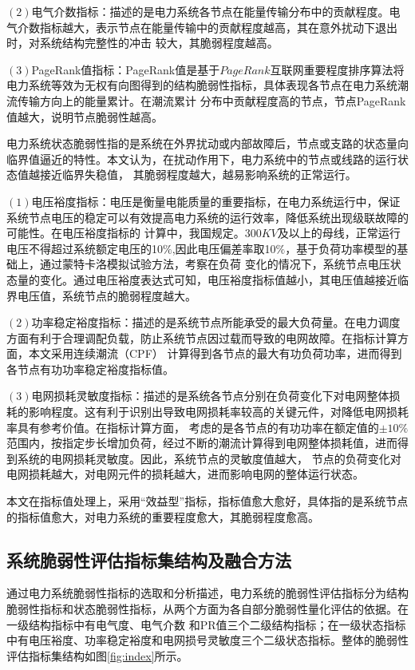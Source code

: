 $(2)$电气介数指标：描述的是电力系统各节点在能量传输分布中的贡献程度。电气介数指标越大，表示节点在能量传输中的贡献程度越高，其在意外扰动下退出时，对系统结构完整性的冲击
较大，其脆弱程度越高。

$(3)$PageRank值指标：PageRank值是基于$PageRank$互联网重要程度排序算法将电力系统等效为无权有向图得到的结构脆弱性指标，具体表现各节点在电力系统潮流传输方向上的能量累计。在潮流累计
分布中贡献程度高的节点，节点PageRank值越大，说明节点脆弱性越高。

电力系统状态脆弱性指的是系统在外界扰动或内部故障后，节点或支路的状态量向临界值逼近的特性。本文认为，在扰动作用下，电力系统中的节点或线路的运行状态值越接近临界失稳值，
其脆弱程度越大，越易影响系统的正常运行。

$(1)$电压裕度指标：电压是衡量电能质量的重要指标，在电力系统运行中，保证系统节点电压的稳定可以有效提高电力系统的运行效率，降低系统出现级联故障的可能性。在电压裕度指标的
计算中，我国规定。300$KV$及以上的母线，正常运行电压不得超过系统额定电压的10$\%$,因此电压偏差率取10$\%$，基于负荷功率模型的基础上，通过蒙特卡洛模拟试验方法，考察在负荷
变化的情况下，系统节点电压状态量的变化。通过电压裕度表达式可知，电压裕度指标值越小，其电压值越接近临界电压值，系统节点的脆弱程度越大。

$(2)$功率稳定裕度指标：描述的是系统节点所能承受的最大负荷量。在电力调度方面有利于合理调配负载，防止系统节点因过载而导致的电网故障。在指标计算方面，本文采用连续潮流（CPF）
计算得到各节点的最大有功负荷功率，进而得到各节点有功功率稳定裕度指标值。

$(3)$电网损耗灵敏度指标：描述的是系统各节点分别在负荷变化下对电网整体损耗的影响程度。这有利于识别出导致电网损耗率较高的关键元件，对降低电网损耗率具有参考价值。在指标计算方面，
考虑的是各节点的有功功率在额定值的$\pm 10 \%$范围内，按指定步长增加负荷，经过不断的潮流计算得到电网整体损耗值，进而得到系统的电网损耗灵敏度。因此，系统节点的灵敏度值越大，
节点的负荷变化对电网损耗越大，对电网元件的损耗越大，进而影响电网的整体运行状态。

本文在指标值处理上，采用“效益型”指标，指标值愈大愈好，具体指的是系统节点的指标值愈大，对电力系统的重要程度愈大，其脆弱程度愈高。

\subsection{系统脆弱性评估指标集结构及融合方法}
\label{sec:IndexSys}
通过电力系统脆弱性指标的选取和分析描述，电力系统的脆弱性评估指标分为结构脆弱性指标和状态脆弱性指标，从两个方面为各自部分脆弱性量化评估的依据。在一级结构指标中有电气度、电气介数
和PR值三个二级结构指标；在一级状态指标中有电压裕度、功率稳定裕度和电网损号灵敏度三个二级状态指标。整体的脆弱性评估指标集结构如图\ref{fig:index}所示。

